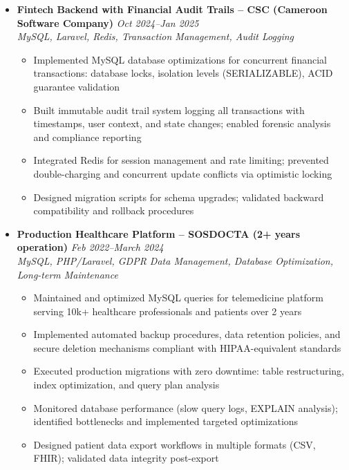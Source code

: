 \documentclass[a4paper,11pt]{article}
\begin{document}
\begin{itemize}[leftmargin=*, label={-}]
\item \textbf{Fintech Backend with Financial Audit Trails -- CSC (Cameroon Software Company)} \hfill \textit{Oct 2024--Jan 2025} \\
\textit{MySQL, Laravel, Redis, Transaction Management, Audit Logging} \vspace{-2pt}
    \begin{itemize}[leftmargin=0.4cm, nosep, label=\tiny$\bullet$]
        \item Implemented MySQL database optimizations for concurrent financial transactions: database locks, isolation levels (SERIALIZABLE), ACID guarantee validation
        \item Built immutable audit trail system logging all transactions with timestamps, user context, and state changes; enabled forensic analysis and compliance reporting
        \item Integrated Redis for session management and rate limiting; prevented double-charging and concurrent update conflicts via optimistic locking
        \item Designed migration scripts for schema upgrades; validated backward compatibility and rollback procedures
    \end{itemize}

\item \textbf{Production Healthcare Platform -- SOSDOCTA (2+ years operation)} \hfill \textit{Feb 2022--March 2024} \\
\textit{MySQL, PHP/Laravel, GDPR Data Management, Database Optimization, Long-term Maintenance} \vspace{-2pt}
    \begin{itemize}[leftmargin=0.4cm, nosep, label=\tiny$\bullet$]
        \item Maintained and optimized MySQL queries for telemedicine platform serving 10k+ healthcare professionals and patients over 2 years
        \item Implemented automated backup procedures, data retention policies, and secure deletion mechanisms compliant with HIPAA-equivalent standards
        \item Executed production migrations with zero downtime: table restructuring, index optimization, and query plan analysis
        \item Monitored database performance (slow query logs, EXPLAIN analysis); identified bottlenecks and implemented targeted optimizations
        \item Designed patient data export workflows in multiple formats (CSV, FHIR); validated data integrity post-export
    \end{itemize}


\end{itemize}
\end{document}
